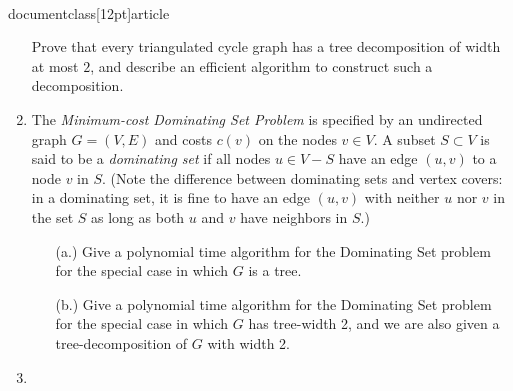 \\documentclass[12pt]{article}
\def\setminus{{-}}
\begin{document}
\begin{enumerate}
Prove that every triangulated cycle graph has a
tree decomposition of width at most $2$,
and describe an efficient algorithm to construct
such a decomposition.



\item 

The {\em Minimum-cost Dominating Set
Problem} is specified by an undirected
graph $G=(V,E)$ and costs $c(v)$ on the nodes $v \in V$. A subset $S \subset V$
is said to be a {\em dominating set}
if all nodes $u \in V\setminus S$ have an edge
$(u,v)$ to a node $v$ in $S$. (Note the difference between dominating
sets and vertex covers: in a dominating set, it is fine to have an edge $(u,v)$
with neither $u$ nor $v$ in the set $S$ as long as both $u$ and $v$ have
neighbors in $S$.)
\begin{itemize}
\item[(a.)] Give a polynomial time algorithm for the  Dominating Set problem
for the special case in which $G$ is a tree.
\item[(b.)] Give a polynomial time algorithm for the  Dominating Set problem
for the special case in which $G$ has tree-width 2, and we are also given
a tree-decomposition of $G$ with width 2.
\end{itemize}


\item


\end{enumerate}
\end{document}
